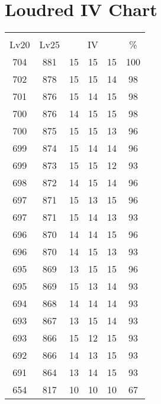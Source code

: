 \documentclass{article}%
\begin{document}
%
\normalsize%
\section{Loudred IV Chart}%
\label{sec:Loudred IV Chart}%
\renewcommand{\arraystretch}{1.5}%
\begin{tabular}{|c|c|c|c|c|c|}%
\hline%
\multicolumn{6}{|c|}{\textcolor{white}{ 
\linebreak{Loudred}
}%
\cellcolor{black}}\\%
\multicolumn{1}{|c}{Lv20}&\multicolumn{1}{c|}{Lv25}&\multicolumn{3}{c|}{IV}&\multicolumn{1}{|c|}{\%}\\%
\hline%
\rowcolor{color100}%
704&881&15&15&15&100\\%
\hline%
\rowcolor{color98}%
702&878&15&15&14&98\\%
\hline%
\rowcolor{color98}%
701&876&15&14&15&98\\%
\hline%
\rowcolor{color98}%
700&876&14&15&15&98\\%
\hline%
\rowcolor{color96}%
700&875&15&15&13&96\\%
\hline%
\rowcolor{color96}%
699&874&15&14&14&96\\%
\hline%
\rowcolor{color93}%
699&873&15&15&12&93\\%
\hline%
\rowcolor{color96}%
698&872&14&15&14&96\\%
\hline%
\rowcolor{color96}%
697&871&15&13&15&96\\%
\hline%
\rowcolor{color93}%
697&871&15&14&13&93\\%
\hline%
\rowcolor{color96}%
696&870&14&14&15&96\\%
\hline%
\rowcolor{color93}%
696&870&14&15&13&93\\%
\hline%
\rowcolor{color96}%
695&869&13&15&15&96\\%
\hline%
\rowcolor{color93}%
695&869&15&13&14&93\\%
\hline%
\rowcolor{color93}%
694&868&14&14&14&93\\%
\hline%
\rowcolor{color93}%
693&867&13&15&14&93\\%
\hline%
\rowcolor{color93}%
693&866&15&12&15&93\\%
\hline%
\rowcolor{color93}%
692&866&14&13&15&93\\%
\hline%
\rowcolor{color93}%
691&864&13&14&15&93\\%
\hline%
\rowcolor{color91}%
654&817&10&10&10&67\\%
\end{tabular}

%
\end{document}
